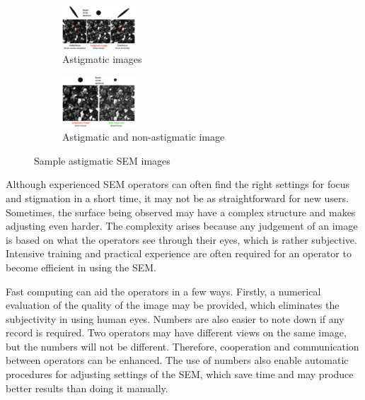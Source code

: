 \documentclass{article}
\begin{document}
\begin{figure}
    \centering
    \begin{subfigure}{\textwidth}
        \centering
        \includegraphics[width=0.3\textwidth]{Images/B astigmatic a.jpeg}
        \caption{Astigmatic images}
        \label{B astigmatic a}
    \end{subfigure}
    \begin{subfigure}{\textwidth}
        \centering
        \includegraphics[width=0.3\textwidth]{Images/B astigmatic b.jpeg}
        \caption{Astigmatic and non-astigmatic image}
        \label{B astigmatic b}
    \end{subfigure}
    \caption{Sample astigmatic SEM images \cite{SEM astigmatism correction}}
    \label{Sample astigmatic SEM images}
\end{figure}

Although experienced SEM operators can often find the right settings for focus and stigmation in a short time, it may not be as straightforward for new users. Sometimes, the surface being observed may have a complex structure and makes adjusting even harder. The complexity arises because any judgement of an image is based on what the operators see through their eyes, which is rather subjective. Intensive training and practical experience are often required for an operator to become efficient in using the SEM.

Fast computing can aid the operators in a few ways. Firstly, a numerical evaluation of the quality of the image may be provided, which eliminates the subjectivity in using human eyes. Numbers are also easier to note down if any record is required. Two operators may have different views on the same image, but the numbers will not be different. Therefore, cooperation and communication between operators can be enhanced. The use of numbers also enable automatic procedures for adjusting settings of the SEM, which save time and may produce better results than doing it manually.
\end{document}
